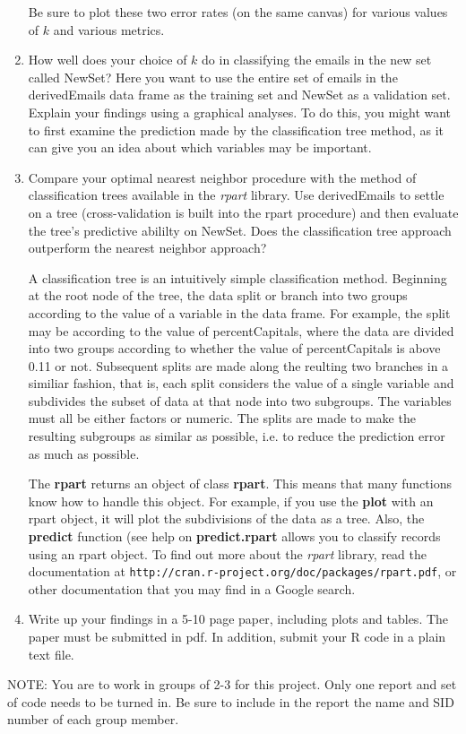 \documentclass{article}
\def\SFunctionRef#1{\textbf{#1}}
\def\Rpackage#1{\textit{#1}}
\begin{document}
\begin{enumerate}
Be sure to plot these two error rates (on the same canvas) 
for various values of $k$ and various metrics.


\item How well does your choice of $k$ do in classifying the
emails in the new set called NewSet? Here you want to use the entire set
of emails in the derivedEmails data frame as the training set
and NewSet as a validation set.
Explain your findings using a graphical analyses.
To do this, you might want to first examine the
prediction made by the classification tree method,
as it can give you an idea about which variables may
be important.

\item Compare your optimal nearest neighbor procedure with
the method of classification trees available in the
\Rpackage{rpart} library. Use derivedEmails to settle on a tree 
(cross-validation is built into the rpart procedure) 
and then evaluate the tree's predictive abililty on NewSet.
Does the classification tree approach outperform 
the nearest neighbor approach?

A classification tree is an intuitively simple classification
method. Beginning at the root node of the tree, the data
split or branch into two groups according to the
value of a variable in the data frame. For example, 
the split may be according to the value of 
percentCapitals, where the data are divided into two groups
according to whether the value of percentCapitals is above 0.11
or not. 
Subsequent splits are made along the reulting two branches
in a similiar fashion, that is, each split considers the
value of a single variable and subdivides the subset of
data at that node into two subgroups. 
The variables must all be either factors or numeric.
The splits are made to make the resulting subgroups
as similar as possible, i.e. to reduce the prediction
error as much as possible.

The \SFunctionRef{rpart} returns an object of class
\SFunctionRef{rpart}. This means that many functions
know how to handle this object. For example, if you
use the \SFunctionRef{plot} with an rpart object,
it will plot the subdivisions of the data as a tree. 
Also, the \SFunctionRef{predict} function (see help
on \SFunctionRef{predict.rpart} allows you to 
classify records using an rpart object.
To find out more about the \Rpackage{rpart}
library, read the documentation at
\texttt{http://cran.r-project.org/doc/packages/rpart.pdf},
or other documentation that you may find in a Google search.

\item
Write up your findings in a 5-10 page paper, including plots
and tables.
The paper must be submitted in pdf.
In addition, submit your R code in a plain text file.

\end{enumerate}

NOTE: You are to work in groups of 2-3 for this project.
Only one report and set of code needs to be turned in.
Be sure to include in the report the name and SID number 
of each group member.
\end{document}
